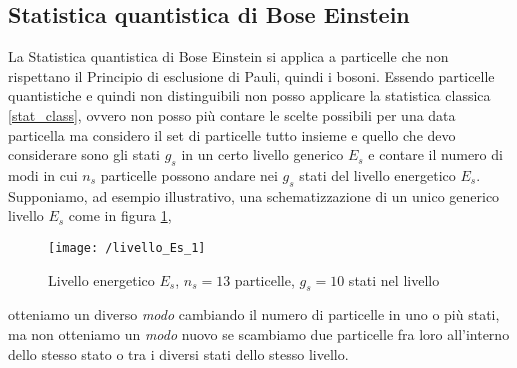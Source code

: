 \subsection{Statistica quantistica di Bose Einstein}
La Statistica quantistica di Bose Einstein si applica a particelle che non rispettano il Principio di esclusione di Pauli, quindi i bosoni.
Essendo particelle quantistiche e quindi non distinguibili non posso applicare la statistica classica \ref{stat_class}, ovvero non posso più contare le scelte possibili per una data particella ma considero il set di particelle tutto insieme e quello che devo considerare sono gli stati $g_s$ in un certo livello generico $E_s$ e contare il numero di modi in cui $n_s$ particelle possono andare nei $g_s$ stati del livello energetico $E_s$.
Supponiamo, ad esempio illustrativo, una schematizzazione di un unico generico livello $E_s$ come in figura \ref{livello_Es},
\begin{figure}[h]
\centering
\texttt{[image: /livello\_Es\_1]}
\caption{Livello energetico $E_s$, $n_s = 13$ particelle, $g_s = 10$ stati nel livello}
\label{livello_Es}
\end{figure}
otteniamo un diverso \textit{modo} cambiando il numero di particelle in uno o più stati, ma non otteniamo un \textit{modo} nuovo se scambiamo due particelle fra loro all'interno dello stesso stato o tra i diversi stati dello stesso livello.

